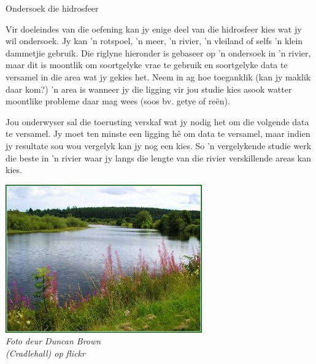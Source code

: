             \begin{Investigation}{Ondersoek die hidrosfeer }
            \nopagebreak 
\begin{minipage}{.5\textwidth}
            \label{m38138*uid4}
Vir doeleindes van die oefening kan jy enige deel van die hidrosfeer kies wat jy wil ondersoek. Jy kan  'n rotspoel,  'n meer,  'n rivier,  'n vleiland of selfs  'n klein dammetjie gebruik. Die riglyne hieronder is gebaseer op  'n ondersoek in  'n rivier, maar dit is moontlik om soortgelyke vrae te gebruik en soortgelyke data te versamel in die area wat jy gekies het. Neem in ag hoe toeganklik (kan jy maklik daar kom?)  'n area is wanneer jy die ligging vir jou studie kies asook watter moontlike probleme daar mag wees (soos bv. getye of re\"{e}n).\par
\label{m38138*uid5}
Jou onderwyser sal die toerusting verskaf wat jy nodig het om die volgende data te versamel. Jy moet ten minste een ligging h\^{e} om data te versamel, maar indien jy resultate sou wou vergelyk kan jy nog een kies. So  'n vergelykende studie werk die beste in  'n rivier waar jy langs die lengte van die rivier verskillende areas kan kies. \par
\end{minipage}
\begin{minipage}{.5\textwidth}
\begin{center}
 \includegraphics[width=.8\textwidth]{photos/DuncanBrown(Cradlehall).jpg} \\
\textsl{Foto deur Duncan Brown\\ (Cradlehall) op flickr}
\end{center}
\end{minipage}
\label{m38138*id334646}\begin{enumerate}[noitemsep, label=\textbf{\arabic*}. ] 

\end{enumerate}
\end{Investigation}
